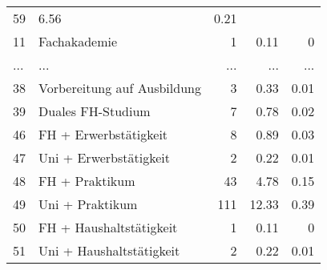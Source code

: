 \begin{longtable}{lXrrr}
          \num{59} &
          \num[round-mode=places,round-precision=2]{6.56} &
          \num[round-mode=places,round-precision=2]{0.21} \\
        11 & \multicolumn{1}{X}{Fachakademie} & %
          \num{1} &
          \num[round-mode=places,round-precision=2]{0.11} &
          \num[round-mode=places,round-precision=2]{0} \\
       ... & ... & ... & ... & ... \\
        38 & \multicolumn{1}{X}{Vorbereitung auf Ausbildung} & %
          \num{3} &
          \num[round-mode=places,round-precision=2]{0.33} &
          \num[round-mode=places,round-precision=2]{0.01} \\

        39 & \multicolumn{1}{X}{Duales FH-Studium} & %
          \num{7} &
          \num[round-mode=places,round-precision=2]{0.78} &
          \num[round-mode=places,round-precision=2]{0.02} \\

        46 & \multicolumn{1}{X}{FH + Erwerbstätigkeit} & %
          \num{8} &
          \num[round-mode=places,round-precision=2]{0.89} &
          \num[round-mode=places,round-precision=2]{0.03} \\

        47 & \multicolumn{1}{X}{Uni + Erwerbstätigkeit} & %
          \num{2} &
          \num[round-mode=places,round-precision=2]{0.22} &
          \num[round-mode=places,round-precision=2]{0.01} \\

        48 & \multicolumn{1}{X}{FH + Praktikum} & %
          \num{43} &
          \num[round-mode=places,round-precision=2]{4.78} &
          \num[round-mode=places,round-precision=2]{0.15} \\

        49 & \multicolumn{1}{X}{Uni + Praktikum} & %
          \num{111} &
          \num[round-mode=places,round-precision=2]{12.33} &
          \num[round-mode=places,round-precision=2]{0.39} \\

        50 & \multicolumn{1}{X}{FH + Haushaltstätigkeit} & %
          \num{1} &
          \num[round-mode=places,round-precision=2]{0.11} &
          \num[round-mode=places,round-precision=2]{0} \\

        51 & \multicolumn{1}{X}{Uni + Haushaltstätigkeit} & %
          \num{2} &
          \num[round-mode=places,round-precision=2]{0.22} &
          \num[round-mode=places,round-precision=2]{0.01} \\


\end{longtable}
